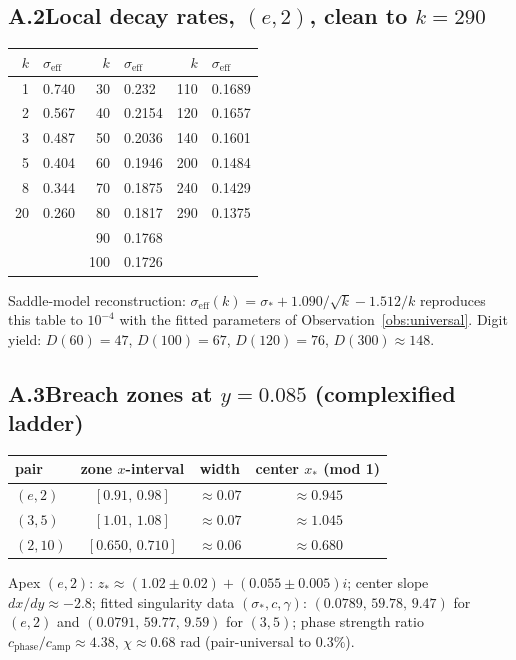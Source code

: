 \documentclass[11pt,a4paper]{article}
\theoremstyle{definition}
\theoremstyle{remark}
\newcommand{\eff}{\mathrm{eff}}
\begin{document}
\subsection*{A.2\quad Local decay rates, $(e,2)$, clean to $k=290$}

\begin{center}
\begin{tabular}{rl@{\qquad}rl@{\qquad}rl}
\toprule
$k$ & $\sigma_\eff$ & $k$ & $\sigma_\eff$ & $k$ & $\sigma_\eff$\\
\midrule
1 & 0.740 & 30 & 0.232 & 110 & 0.1689\\
2 & 0.567 & 40 & 0.2154 & 120 & 0.1657\\
3 & 0.487 & 50 & 0.2036 & 140 & 0.1601\\
5 & 0.404 & 60 & 0.1946 & 200 & 0.1484\\
8 & 0.344 & 70 & 0.1875 & 240 & 0.1429\\
20 & 0.260 & 80 & 0.1817 & 290 & 0.1375\\
 & & 90 & 0.1768 & & \\
 & & 100 & 0.1726 & & \\
\bottomrule
\end{tabular}
\end{center}

\noindent Saddle-model reconstruction:
$\sigma_\eff(k)=\sigma_*+1.090/\sqrt k-1.512/k$ reproduces this table to $10^{-4}$ with the
fitted parameters of Observation~\ref{obs:universal}. Digit yield: $D(60)=47$,
$D(100)=67$, $D(120)=76$, $D(300)\approx148$.

\subsection*{A.3\quad Breach zones at $y=0.085$ (complexified ladder)}

\begin{center}
\begin{tabular}{lccc}
\toprule
pair & zone $x$-interval & width & center $x_*$ (mod 1)\\
\midrule
$(e,2)$ & $[0.91,\,0.98]$ & $\approx0.07$ & $\approx0.945$\\
$(3,5)$ & $[1.01,\,1.08]$ & $\approx0.07$ & $\approx1.045$\\
$(2,10)$ & $[0.650,\,0.710]$ & $\approx0.06$ & $\approx0.680$\\
\bottomrule
\end{tabular}
\end{center}

\noindent Apex $(e,2)$: $z_*\approx(1.02\pm0.02)+(0.055\pm0.005)i$; center slope
$dx/dy\approx-2.8$; fitted singularity data $(\sigma_*,c,\gamma)$:
$(0.0789,\,59.78,\,9.47)$ for $(e,2)$ and $(0.0791,\,59.77,\,9.59)$ for $(3,5)$; phase
strength ratio $c_{\text{phase}}/c_{\text{amp}}\approx4.38$, $\chi\approx0.68$ rad
(pair-universal to $0.3\%$).
\end{document}
